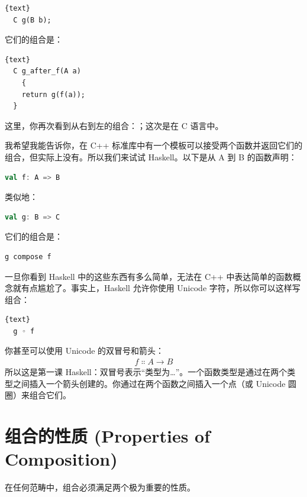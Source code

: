 \begin{lstlisting}{text}
  C g(B b);
\end{lstlisting}
它们的组合是：

\begin{lstlisting}{text}
  C g_after_f(A a)
    {
    return g(f(a));
  }
\end{lstlisting}
这里，你再次看到从右到左的组合：；这次是在 C 语言中。

我希望我能告诉你，在 C++ 标准库中有一个模板可以接受两个函数并返回它们的组合，但实际上没有。所以我们来试试 Haskell。以下是从 A 到 B 的函数声明：

\begin{lstlisting}[language=Scala]
val f: A => B
\end{lstlisting}
类似地：

\begin{lstlisting}[language=Scala]
val g: B => C
\end{lstlisting}
它们的组合是：

\begin{lstlisting}[language=Scala]
g compose f
\end{lstlisting}
一旦你看到 Haskell 中的这些东西有多么简单，无法在 C++ 中表达简单的函数概念就有点尴尬了。事实上，Haskell 允许你使用 Unicode 字符，所以你可以这样写组合：
\begin{lstlisting}{text}
  g ◦ f
\end{lstlisting}

你甚至可以使用 Unicode 的双冒号和箭头：
\begin{align}
  f \ensuremath{\Colon} A → B
\end{align}
所以这是第一课 Haskell：双冒号表示“类型为\ldots{}”。一个函数类型是通过在两个类型之间插入一个箭头创建的。你通过在两个函数之间插入一个点（或 Unicode 圆圈）来组合它们。

\section{组合的性质 (Properties of Composition)}

在任何范畴中，组合必须满足两个极为重要的性质。

